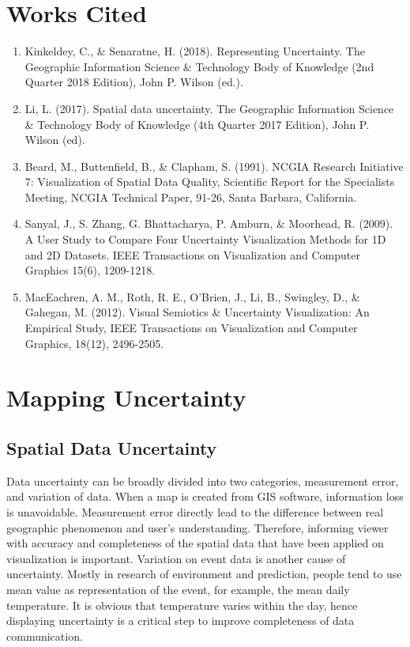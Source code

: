 \documentclass[11pt,letterpaper]{article}
\begin{document}
\section*{Works Cited}
\begin{enumerate}
\item Kinkeldey, C., \& Senaratne, H. (2018). Representing Uncertainty. The Geographic Information Science \& Technology Body of Knowledge (2nd Quarter 2018 Edition), John P. Wilson (ed.). \\
\item Li, L. (2017). Spatial data uncertainty. The Geographic Information Science \& Technology Body of Knowledge (4th Quarter 2017 Edition), John P. Wilson (ed).\\
\item Beard, M., Buttenfield, B., \& Clapham, S. (1991). NCGIA Research Initiative 7: Visualization of Spatial Data Quality, Scientific Report for the Specialists Meeting, NCGIA Technical Paper, 91-26, Santa Barbara, California. \\
\item Sanyal, J., S. Zhang, G. Bhattacharya, P. Amburn, \& Moorhead, R. (2009). A User Study to Compare Four Uncertainty Visualization Methods for 1D and 2D Datasets. IEEE Transactions on Visualization and Computer Graphics 15(6), 1209-1218. \\
\item MacEachren, A. M., Roth, R. E., O'Brien, J., Li, B., Swingley, D., \& Gahegan, M. (2012). Visual Semiotics \& Uncertainty Visualization: An Empirical Study, IEEE Transactions on Visualization and Computer Graphics, 18(12), 2496-2505.
\end{enumerate}



\section{Mapping Uncertainty}
\subsection*{Spatial Data Uncertainty}
Data uncertainty can be broadly divided into two categories, measurement error, and variation of data. When a map is created from GIS software, information loss is unavoidable. Measurement error directly lead to the difference between real geographic phenomenon and user's understanding. Therefore, informing viewer with accuracy and completeness of the spatial data that have been applied on visualization is important. Variation on event data is another cause of uncertainty. Mostly in research of environment and prediction, people tend to use mean value as representation of the event, for example, the mean daily temperature. It is obvious that temperature varies within the day, hence displaying uncertainty is a critical step to improve completeness of data communication. 
\end{document}
